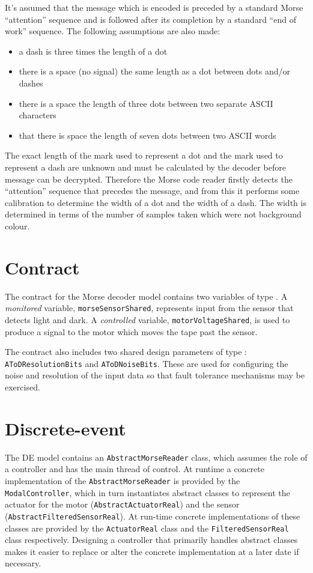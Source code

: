 It's assumed that the message which is encoded is preceded by a
standard Morse ``attention'' sequence and is followed after its
completion by a standard ``end of work'' sequence.  The following
assumptions are also made:
\begin{itemize}
\item a dash is three times the length of a dot
\item there is a space (no signal) the same length as a dot between
  dots and/or dashes
\item there is a space the length of three dots between two separate
  ASCII characters
\item that there is space the length of seven dots between two ASCII
  words
\end{itemize}
The exact length of the mark used to represent a dot and the mark used
to represent a dash are unknown and must be calculated by the decoder
before message can be decrypted.  Therefore the Morse code reader
firstly detects the ``attention'' sequence that precedes the message,
and from this it performs some calibration to determine the width of a
dot and the width of a dash. The width is determined in terms of the
number of samples taken which were not background colour.

\section{Contract} The contract for the Morse decoder model contains two variables of type
. A \emph{monitored} variable, \texttt{morseSensorShared},
represents input from the sensor that detects light and dark.  A
\emph{controlled} variable, \texttt{motorVoltageShared}, is used to
produce a signal to the motor which moves the tape past the sensor.

The contract also includes two shared design parameters of type
: \texttt{AToDResolutionBits} and \texttt{AToDNoiseBits}.
These are used for configuring the noise and resolution of the input
data so that fault tolerance mechanisms may be exercised.

\section{Discrete-event} The DE model contains an
\texttt{AbstractMorseReader} class, which assumes the role of a
controller and has the main thread of control.  At runtime a concrete
implementation of the \texttt{Abstract\-MorseReader} is provided by the
\texttt{ModalController}, which in turn instantiates abstract classes
to represent the actuator for the motor
(\texttt{AbstractActuatorReal}) and the sensor
(\texttt{AbstractFilteredSensorReal}). At run-time concrete
implementations of these classes are provided by the
\texttt{ActuatorReal} class and the \texttt{FilteredSensorReal} class
respectively. Designing a controller that primarily handles abstract
classes makes it easier to replace or alter the concrete
implementation at a later date if necessary.

